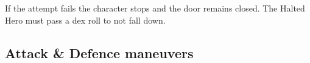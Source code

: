 If the attempt fails the character stops and the door remains closed. The Halted Hero must pass a dex roll to not fall down.



%
%
%
%
%
%
%
%
%


\closeskillslist




\subsection*{Attack \& Defence maneuvers}

